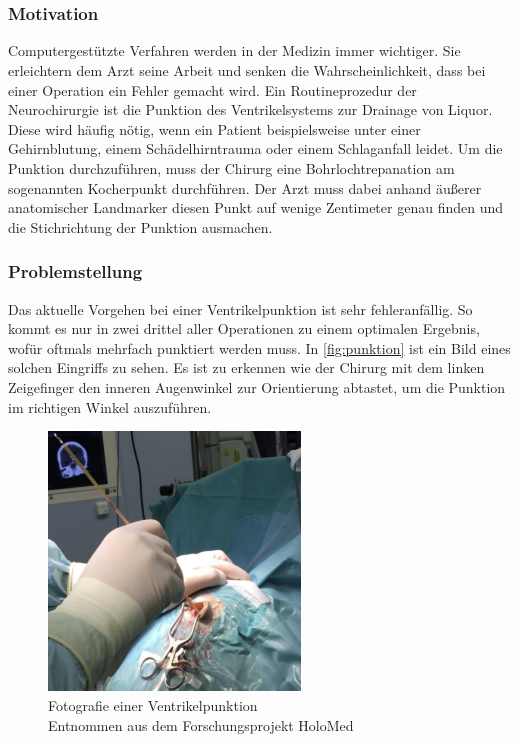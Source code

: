 \chapter{}
\label{sec:Introduction}

\subsection{Motivation}

Computergestützte Verfahren werden in der Medizin immer wichtiger. Sie erleichtern dem Arzt seine Arbeit und senken die Wahrscheinlichkeit, dass bei einer Operation ein Fehler gemacht wird.
\newline
Ein Routineprozedur der Neurochirurgie ist die Punktion des Ventrikelsystems zur Drainage von Liquor. Diese wird häufig nötig, wenn ein Patient beispielsweise unter einer Gehirnblutung, einem Schädelhirntrauma oder einem Schlaganfall leidet.
\newline
Um die Punktion durchzuführen, muss der Chirurg eine Bohrlochtrepanation am sogenannten Kocherpunkt durchführen. Der Arzt muss dabei anhand äußerer anatomischer Landmarker diesen Punkt auf wenige Zentimeter genau finden und die Stichrichtung der Punktion ausmachen.



\subsection{Problemstellung}

Das aktuelle Vorgehen bei einer Ventrikelpunktion ist sehr fehleranfällig. So kommt es nur in zwei drittel aller Operationen zu einem optimalen Ergebnis, wofür oftmals mehrfach punktiert werden muss. In \autoref{fig:punktion} ist ein Bild eines solchen Eingriffs zu sehen. Es ist zu erkennen wie der Chirurg mit dem linken Zeigefinger den inneren Augenwinkel zur Orientierung abtastet, um die Punktion im richtigen Winkel auszuführen.


\begin{figure}[!h] 
\centering 
\includegraphics[width=0.6\textwidth]{Logos/Punktion2.png}
\caption{Fotografie einer Ventrikelpunktion  \\ Entnommen aus dem Forschungsprojekt HoloMed \protect\cite{punktion}} 
\label{fig:punktion} 
\end{figure}


